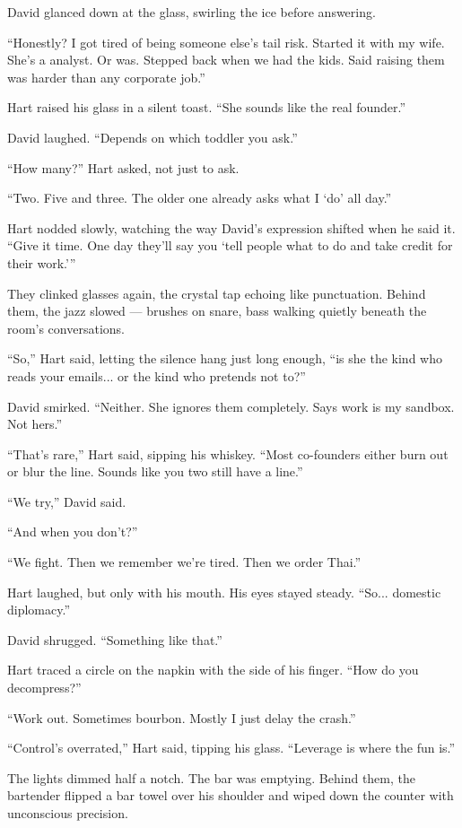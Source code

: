 David glanced down at the glass, swirling the ice before answering.

“Honestly? I got tired of being someone else’s tail risk. Started it with my wife. She’s a analyst. Or was. 
Stepped back when we had the kids. Said raising them was harder than any corporate job.”

Hart raised his glass in a silent toast. “She sounds like the real founder.”

David laughed. “Depends on which toddler you ask.”

“How many?” Hart asked, not just to ask.

“Two. Five and three. The older one already asks what I ‘do’ all day.”

Hart nodded slowly, watching the way David’s expression shifted when he said it.  
“Give it time. One day they’ll say you ‘tell people what to do and take credit for their work.’”

They clinked glasses again, the crystal tap echoing like punctuation. Behind them, the jazz slowed — 
brushes on snare, bass walking quietly beneath the room’s conversations.

“So,” Hart said, letting the silence hang just long enough, “is she the kind who reads your 
emails... or the kind who pretends not to?”

David smirked. “Neither. She ignores them completely. Says work is my sandbox. Not hers.”

“That’s rare,” Hart said, sipping his whiskey. “Most co-founders either burn out or blur the line. 
Sounds like you two still have a line.”

“We try,” David said.

“And when you don’t?”

“We fight. Then we remember we’re tired. Then we order Thai.”

Hart laughed, but only with his mouth. His eyes stayed steady. “So... domestic diplomacy.”

David shrugged. “Something like that.”

Hart traced a circle on the napkin with the side of his finger. “How do you decompress?”

“Work out. Sometimes bourbon. Mostly I just delay the crash.”

“Control’s overrated,” Hart said, tipping his glass. “Leverage is where the fun is.”

The lights dimmed half a notch. The bar was emptying. Behind them, the bartender flipped a bar towel over his 
shoulder and wiped down the counter with unconscious precision.

